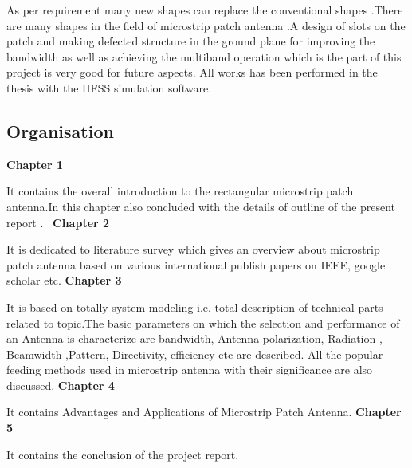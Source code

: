  \justify
   As per requirement many new shapes can replace the conventional shapes .There are many shapes in the field of microstrip patch antenna .A design of slots on the patch and making defected structure in the ground plane for improving the bandwidth as well as achieving the multiband operation which is the part of this project is very good for future aspects. All works has been performed in the thesis with the HFSS simulation software.

\cleardoublepage


\subsection{Organisation}\label{sub:Organisation}
 \justify
  \textbf{Chapter 1}

      It contains the overall introduction to the rectangular microstrip patch antenna.In this chapter also concluded with the details of outline of the present report .\
 \justify
  \textbf{Chapter 2}

      It is dedicated to literature survey which gives an overview about microstrip patch antenna based on various international publish papers on IEEE, google scholar etc.
 \justify
  \textbf{Chapter 3}

      It is based on totally system modeling i.e. total description of technical parts related to topic.The basic parameters on which the selection and performance of an Antenna is characterize are bandwidth, Antenna polarization, Radiation , Beamwidth ,Pattern, Directivity, efficiency etc are described. All the popular feeding methods used in microstrip antenna with their significance are also discussed.
 \justify
  \textbf{Chapter 4}

      It contains Advantages and Applications of Microstrip Patch Antenna.
 \justify
  \textbf{Chapter 5}

      It contains the conclusion of the project report.
\cleardoublepage
